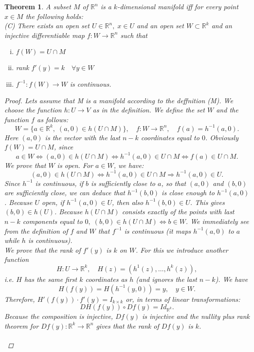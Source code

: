 \documentclass[11pt]{article}
\def\RR{\mathbb{R}}
\newtheorem{theorem}{Theorem}[section]
\begin{document}
\begin{theorem}\label{man1}
A subset $M$ of $\RR^n$ is a $k$-dimensional manifold iff for every point $x \in M$ the following holds:\\
(C) There exists an open set $U \in \RR^n,\; x \in U$ and an open set $W \subset \RR^k$ and an injective
differentiable map $f : W \rightarrow \RR^n$ such that
\begin{enumerate}[(i)]
\item $f(W) = U \cap M$
\item rank $f'(y) = k \quad \forall y \in W$
\item $f^{-1} : f(W) \rightarrow W$ is continuous.
\end{enumerate}
\begin{proof}
 Lets assume that M is a manifold according to the deffnition (M). We choose the function $h : U \rightarrow V$ as in the definition. We define the set $W$ and the function $f$ as follows:
\[W = \{a \in \RR^k, \; (a, 0) \in h(U \cap M) \}, \quad f : W \rightarrow \RR^n, \quad  f(a) = h^{-1}(a, 0).\]
Here $(a, 0)$ is the vector with the last $n-k$ coordinates equal to $0$. Obviously $f(W) = U\cap M$, since
\[a \in W \Leftrightarrow (a, 0) \in h(U \cap M) \Leftrightarrow h^{-1}(a, 0) \in U \cap M \Leftrightarrow f(a) \in U \cap M.\]
We prove that $W$ is open. For $a \in W$, we have:
\[(a, 0) \in h(U \cap M) \Leftrightarrow h^{-1}(a, 0) \in U \cap M \Rightarrow h^{-1}(a, 0) \in U.\]
Since $h^{-1}$ is continuous, if $b$ is sufficiently close to $a$, so that $(a, 0)$ and $(b, 0)$ are sufficiently close, we can deduce that $h^{-1}(b, 0)$ is close enough to $h^{-1}(a, 0)$. Because $U$ open, if $h^{-1}(a, 0) \in U$, then also $h^{-1}(b, 0) \in U$. This gives $(b, 0) \in h(U)$. Because $h(U \cap M)$ consists exactly of the points with last $n- k$ components equal to $0, \; (b, 0) \in h(U\cap M) \Leftrightarrow b \in W$. We immediately see from the definition of $f$ and $W$ that $f^{-1}$ is continuous (it maps $h^{-1}(a, 0)$ to $a$ while $h$ is continuous).\\
We prove that the rank of $f'(y)$ is $k$ on $W$. For this we introduce another function
\[H : U \rightarrow \RR^k, \quad  H(z) = (h^1(z),\dots , h^k(z)),\]
i.e. $H$ has the same first $k$ coordinates as $h$ (and ignores the last $n - k$). We have
\[H(f(y)) = H(h^{-1}(y, 0)) = y, \quad  y \in W.\]
Therefore, $H'(f(y) )\cdot f'(y) = I_{k\times k}$ or, in terms of linear transformations:
\[DH(f(y)) \circ Df(y) = Id_{\RR^k}.\]
Because the composition is injective, $Df(y)$ is injective and the nullity plus rank theorem for $Df(y) : \RR^k \rightarrow \RR^n$ gives that the rank of $Df(y)$ is $k$.\\ \\

\end{proof}
\end{theorem}
\end{document}
